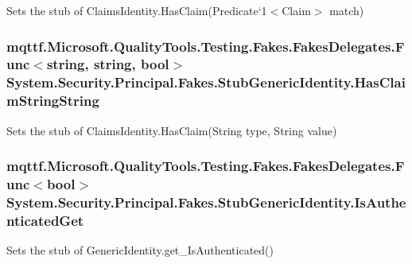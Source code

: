Sets the stub of Claims\-Identity.\-Has\-Claim(Predicate`1$<$Claim$>$ match)

\hypertarget{class_system_1_1_security_1_1_principal_1_1_fakes_1_1_stub_generic_identity_a9a64f2e2383c238e6fccc569fc0c1db0}{
\subsubsection[{Has\-Claim\-String\-String}]{\setlength{\rightskip}{0pt plus 5cm}mqttf.\-Microsoft.\-Quality\-Tools.\-Testing.\-Fakes.\-Fakes\-Delegates.\-Func$<$string, string, bool$>$ System.\-Security.\-Principal.\-Fakes.\-Stub\-Generic\-Identity.\-Has\-Claim\-String\-String}}\label{class_system_1_1_security_1_1_principal_1_1_fakes_1_1_stub_generic_identity_a9a64f2e2383c238e6fccc569fc0c1db0}


Sets the stub of Claims\-Identity.\-Has\-Claim(\-String type, String value)

\hypertarget{class_system_1_1_security_1_1_principal_1_1_fakes_1_1_stub_generic_identity_af53e2e026aa95fb7a57101cb1c013c7a}{
\subsubsection[{Is\-Authenticated\-Get}]{\setlength{\rightskip}{0pt plus 5cm}mqttf.\-Microsoft.\-Quality\-Tools.\-Testing.\-Fakes.\-Fakes\-Delegates.\-Func$<$bool$>$ System.\-Security.\-Principal.\-Fakes.\-Stub\-Generic\-Identity.\-Is\-Authenticated\-Get}}\label{class_system_1_1_security_1_1_principal_1_1_fakes_1_1_stub_generic_identity_af53e2e026aa95fb7a57101cb1c013c7a}


Sets the stub of Generic\-Identity.\-get\-\_\-\-Is\-Authenticated()

